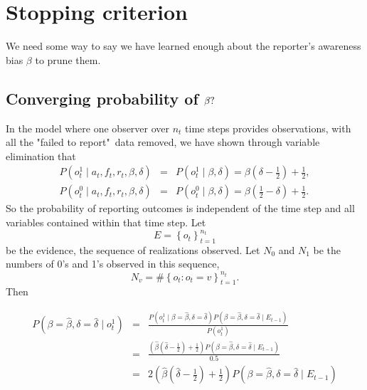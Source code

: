 \documentclass{amsart}
\theoremstyle{definition}
\theoremstyle{plain}
\numberwithin{equation}{section}
\begin{document}
\section{Stopping criterion}

We need some way to say we have learned enough about the reporter's
awareness bias $\beta $ to prune them. 

\subsection{Converging probability of $\protect\beta ?$}

In the model where one observer over $n_{t}$ time steps provides
observations, with all the "failed to report"\ data removed, we have shown
through variable elimination that 
\begin{eqnarray*}
P\left( o_{t}^{1}\mid a_{t},f_{t},r_{t},\beta ,\delta \right)  &=&P\left(
o_{t}^{1}\mid \beta ,\delta \right) =\beta \left( \delta -\frac{1}{2}\right)
+\frac{1}{2}, \\
P\left( o_{t}^{0}\mid a_{t},f_{t},r_{t},\beta ,\delta \right)  &=&P\left(
o_{t}^{0}\mid \beta ,\delta \right) =\beta \left( \frac{1}{2}-\delta \right)
+\frac{1}{2}.
\end{eqnarray*}%
So the probability of reporting outcomes is independent of the time step and
all variables contained within that time step. Let 
\begin{equation*}
E=\left\{ o_{t}\right\} _{t=1}^{n_{t}}
\end{equation*}%
be the evidence, the sequence of realizations observed. Let $N_{0}$ and $%
N_{1}$ be the numbers of 0's and 1's observed in this sequence,%
\begin{equation*}
N_{v}=\#\left\{ o_{t}:o_{t}=v\right\} _{t=1}^{n_{t}}.
\end{equation*}%
Then

\begin{eqnarray*}
P\left( \beta =\hat{\beta},\delta =\hat{\delta}\mid o_{t}^{1}\right)  &=&%
\frac{P\left( o_{t}^{1}\mid \beta =\hat{\beta},\delta =\hat{\delta}\right)
P\left( \beta =\hat{\beta},\delta =\hat{\delta}\mid E_{t-1}\right) }{P\left(
o_{t}^{1}\right) } \\
&=&\frac{\left( \hat{\beta}\left( \hat{\delta}-\frac{1}{2}\right) +\frac{1}{2%
}\right) P\left( \beta =\hat{\beta},\delta =\hat{\delta}\mid E_{t-1}\right) 
}{0.5} \\
&=&2\left( \hat{\beta}\left( \hat{\delta}-\frac{1}{2}\right) +\frac{1}{2}%
\right) P\left( \beta =\hat{\beta},\delta =\hat{\delta}\mid E_{t-1}\right) 
\end{eqnarray*}
\end{document}
